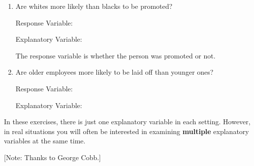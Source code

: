 \begin{enumerate}
\item Are whites more likely than blacks to be promoted? 

Response Variable:\\

Explanatory Variable:\\

\begin{AnswerText}
The response variable is whether the person was promoted or not.
\end{AnswerText}

\item Are older employees more likely to be laid off than younger ones?  

Response Variable:\\

Explanatory Variable:\\ 
\end{enumerate}

\begin{AnswerText}
In these exercises, there is just one explanatory variable in each setting.  However,
in real situations you will often be interested in 
examining {\bf multiple} explanatory variables at the same time.  
\end{AnswerText}
\bigskip

[Note: Thanks to George Cobb.]